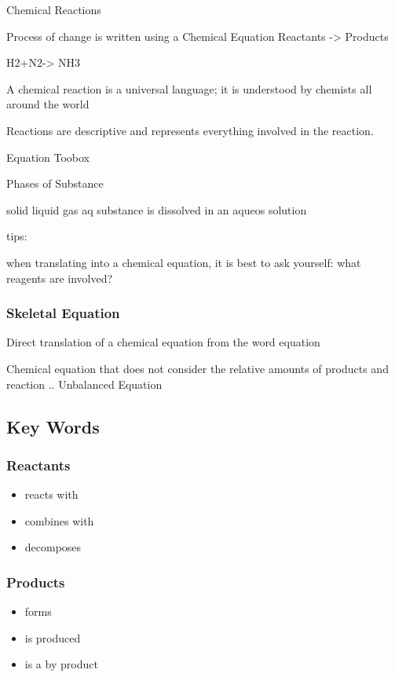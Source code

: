 \documentclass{article}
\begin{document}
Chemical Reactions

Process of change is written using a Chemical Equation
Reactants -> Products

H2+N2-> NH3

A chemical reaction is a universal language; it is understood by chemists all around the world

Reactions are descriptive and represents everything involved in the reaction.

Equation Toobox

Phases of Substance

solid
liquid
gas
aq substance is dissolved in an aqueos solution

tips:

when translating into a chemical equation, it is best to ask yourself: what reagents are involved?
\subsubsection{Skeletal Equation}
Direct translation of a chemical equation from the word equation

Chemical equation that does not consider the relative amounts of products and reaction .. Unbalanced Equation

\subsection*{Key Words}
\subsubsection{Reactants}
\begin{itemize}
    \item reacts with
    \item combines with
    \item decomposes
\end{itemize}
\subsubsection{Products}
\begin{itemize}
    \item forms
    \item is produced
    \item is a by product
\end{itemize}
\end{document}
